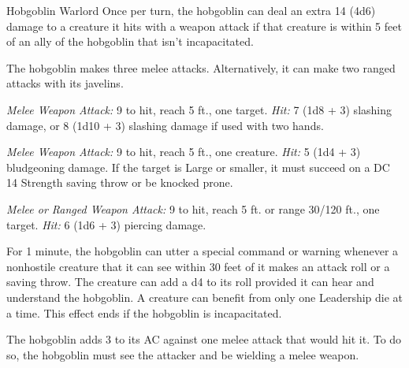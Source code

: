 \documentclass[10pt,a4paper,twoside,bg=print,twocolumn,openany,nodeprecatedcode]{dndbook}
\begin{document}
\begin{DndMonster}[float=t]{Hobgoblin Warlord}
\DndMonsterBasics[
armor-class = {20 (\textit{plate armor})},
hit-points = {\DndDice{13d8 + 39}},
speed = {30 ft.}
]
\DndMonsterAbilityScores[
 str = 16,
 dex = 14,
 con = 16,
 int = 14,
 wis = 11,
 cha = 15
]
\DndMonsterDetails[
saving-throws = {Int +5, Wis +3, Cha +5},
senses = {darkvision 60 ft., passive perception 10},
languages = {Common, Goblin},
challenge = 6,
]
Once per turn, the hobgoblin can deal an extra 14 (4d6) damage to a creature it hits with a weapon attack if that creature is within 5 feet of an ally of the hobgoblin that isn't incapacitated.

The hobgoblin makes three melee attacks. Alternatively, it can make two ranged attacks with its javelins.

\textsl{Melee Weapon Attack:} 9 to hit, reach 5 ft., one target. \textsl{Hit:} 7 (1d8 + 3) slashing damage, or 8 (1d10 + 3) slashing damage if used with two hands.

\textsl{Melee Weapon Attack:} 9 to hit, reach 5 ft., one creature. \textsl{Hit:} 5 (1d4 + 3) bludgeoning damage. If the target is Large or smaller, it must succeed on a DC 14 Strength saving throw or be knocked prone.

\textsl{Melee or Ranged Weapon Attack:} 9 to hit, reach 5 ft. or range 30/120 ft., one target. \textsl{Hit:} 6 (1d6 + 3) piercing damage.

For 1 minute, the hobgoblin can utter a special command or warning whenever a nonhostile creature that it can see within 30 feet of it makes an attack roll or a saving throw. The creature can add a d4 to its roll provided it can hear and understand the hobgoblin. A creature can benefit from only one Leadership die at a time. This effect ends if the hobgoblin is incapacitated.

The hobgoblin adds 3 to its AC against one melee attack that would hit it. To do so, the hobgoblin must see the attacker and be wielding a melee weapon.

\end{DndMonster}
\end{document}
